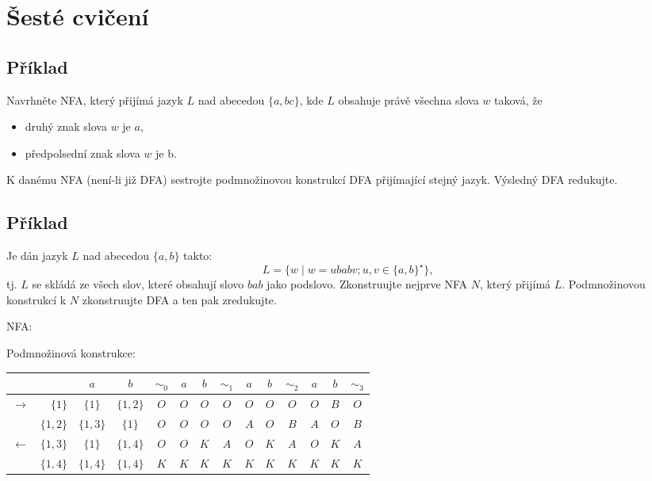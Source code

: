 \section{Šesté cvičení}

\subsection{Příklad}
Navrhněte NFA, který přijímá jazyk $L$ nad abecedou $\{a,bc\}$, kde $L$ obsahuje právě všechna slova $w$ taková, že
\begin{itemize}[noitemsep]
    \item druhý znak slova $w$ je $a$,
    \item předpolsední znak slova $w$ je b.
\end{itemize}
K danému NFA (není-li již DFA) sestrojte podmnožinovou konstrukcí DFA přijímající stejný jazyk. Výsledný DFA redukujte.

\subsection{Příklad}
Je dán jazyk $L$ nad abecedou $\{a,b\}$ takto: 
\[L = \{w \mid w = ubabv; u,v\in\{a,b\}^\star\}\text{,}\] 
tj. $L$ se skládá ze všech slov, které obsahují slovo $bab$ jako podslovo. Zkonstruujte nejprve NFA $N$, který přijímá 
$L$. Podmnožinovou konstrukcí k $N$ zkonstruujte DFA a ten pak zredukujte.

NFA: 


Podmnožinová konstrukce: 

\begin{tabular}{|r r|c c||c|c c||c|c c||c|c c||c|}
    \hline
    & & $a$ & $b$ & $ \sim_0 $ & $a$ & $b$ & $\sim_1$ & $a$ & $b$ & $\sim_2$ & $a$ & $b$ & $\sim_3$ \\ \hline \hline
    $\to$ & $\{1\}$ & $\{1\}$ & $\{1,2\}$ & $O$ & $O$ & $O$ & $O$ & $O$ & $O$ & $O$ & $O$ & $B$ & $O$ \\
          & $\{1,2\}$ & $\{1,3\}$ & $\{1\}$ & $O$ & $O$ & $O$ & $O$ & $A$ & $O$ & $B$ & $A$ & $O$ & $B$ \\
    $\gets$ & $\{1,3\}$ & $\{1\}$ & $\{1,4\}$ & $O$ & $O$ & $K$ & $A$ & $O$ & $K$ & $A$ & $O$ & $K$ & $A$ \\
            & $\{1,4\}$ & $\{1,4\}$ & $\{1,4\}$ & $K$ & $K$ & $K$ & $K$ & $K$ & $K$ & $K$ & $K$ & $K$ & $K$ \\ 
    \hline
\end{tabular}

